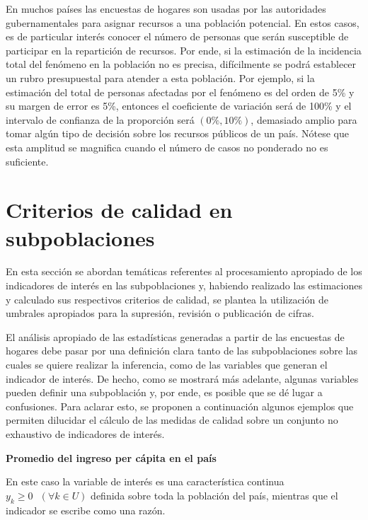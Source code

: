 \documentclass[
  12pt,
]{book}
\begin{document}
En muchos países las encuestas de hogares son usadas por las autoridades gubernamentales para asignar recursos a una población potencial. En estos casos, es de particular interés conocer el número de personas que serán susceptible de participar en la repartición de recursos. Por ende, si la estimación de la incidencia total del fenómeno en la población no es precisa, difícilmente se podrá establecer un rubro presupuestal para atender a esta población. Por ejemplo, si la estimación del total de personas afectadas por el fenómeno es del orden de 5\% y su margen de error es 5\%, entonces el coeficiente de variación será de 100\% y el intervalo de confianza de la proporción será \((0 \%, 10 \%)\), demasiado amplio para tomar algún tipo de decisión sobre los recursos públicos de un país. Nótese que esta amplitud se magnifica cuando el número de casos no ponderado no es suficiente.

\hypertarget{criterios-de-calidad-en-subpoblaciones}{%
\section{Criterios de calidad en subpoblaciones}\label{criterios-de-calidad-en-subpoblaciones}}

En esta sección se abordan temáticas referentes al procesamiento apropiado de los indicadores de interés en las subpoblaciones y, habiendo realizado las estimaciones y calculado sus respectivos criterios de calidad, se plantea la utilización de umbrales apropiados para la supresión, revisión o publicación de cifras.

El análisis apropiado de las estadísticas generadas a partir de las encuestas de hogares debe pasar por una definición clara tanto de las subpoblaciones sobre las cuales se quiere realizar la inferencia, como de las variables que generan el indicador de interés. De hecho, como se mostrará más adelante, algunas variables pueden definir una subpoblación y, por ende, es posible que se dé lugar a confusiones. Para aclarar esto, se proponen a continuación algunos ejemplos que permiten dilucidar el cálculo de las medidas de calidad sobre un conjunto no exhaustivo de indicadores de interés.

\textbf{Promedio del ingreso per cápita en el país}

En este caso la variable de interés es una característica continua \(y_k \geq 0 \ \ \ (\forall k \in U)\) definida sobre toda la población del país, mientras que el indicador se escribe como una razón.
\end{document}
